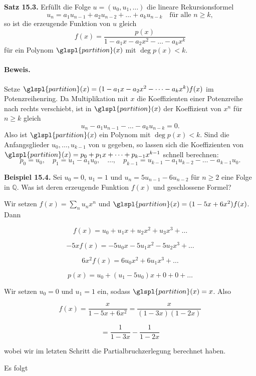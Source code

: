 \documentclass[9pt]{article}
\begin{document}
\textbf{Satz 15.3.} Erfüllt die Folge \( u = (u_0, u_1, \dots) \) die lineare Rekursionsformel
\[
u_n = a_1 u_{n-1} + a_2 u_{n-2} + \dots + a_k u_{n-k} \quad \text{für alle } n \geq k,
\]
so ist die erzeugende Funktion von \( u \) gleich
\[
f(x) = \frac{p(x)}{1 - a_1x - a_2x^2 - \dots - a_kx^k}
\]
für ein Polynom \(\glspl{partition}(x) \) mit \( \deg p(x) < k \).

\paragraph{Beweis.} Setze \(\glspl{partition}(x) = (1 - a_1x - a_2x^2 - \dots - a_kx^k) f(x) \) im Potenzreihenring.  
Da Multiplikation mit \( x \) die Koeffizienten einer Potenzreihe nach rechts verschiebt, ist in \(\glspl{partition}(x) \) der Koeffizient von \( x^n \) für \( n \geq k \) gleich
\[
u_n - a_1 u_{n-1} - \dots - a_k u_{n-k} = 0.
\]
Also ist \(\glspl{partition}(x) \) ein Polynom mit \( \deg p(x) < k \).  
Sind die Anfangsglieder \( u_0, \dots, u_{k-1} \) von \( u \) gegeben, so lassen sich die Koeffizienten von \(\glspl{partition}(x) = p_0 + p_1x + \dots + p_{k-1}x^{k-1} \) schnell berechnen:
\[
p_0 = u_0, \quad p_1 = u_1 - a_1 u_0, \quad \dots, \quad p_{k-1} = u_{k-1} - a_1 u_{k-2} - \dots - a_{k-1} u_0.
\]

\textbf{Beispiel 15.4.} Sei \( u_0 = 0 \), \( u_1 = 1 \) und \( u_n = 5u_{n-1} - 6u_{n-2} \) für \( n \geq 2 \)  
eine Folge in \( \mathbb{Q} \). Was ist deren erzeugende Funktion \( f(x) \) und geschlossene  
Formel?  

Wir setzen \( f(x) = \sum\limits_{n} u_n x^n \) und \(\glspl{partition}(x) = (1 - 5x + 6x^2) f(x) \). Dann  

\[
f(x) = u_0 + u_1x + u_2x^2 + u_3x^3 + \dots
\]

\[
-5x f(x) = - 5u_0x - 5u_1x^2 - 5u_2x^3 + \dots
\]

\[
6x^2 f(x) = 6u_0x^2 + 6u_1x^3 + \dots
\]

\[
p(x) = u_0 + (u_1 - 5u_0)x + 0 + 0 + \dots
\]

Wir setzen \( u_0 = 0 \) und \( u_1 = 1 \) ein, sodass \(\glspl{partition}(x) = x \). Also  

\[
f(x) = \frac{x}{1 - 5x + 6x^2} = \frac{x}{(1 - 3x)(1 - 2x)}
\]

\[
= \frac{1}{1 - 3x} - \frac{1}{1 - 2x}
\]

wobei wir im letzten Schritt die Partialbruchzerlegung berechnet haben.  

Es folgt 
\end{document}
